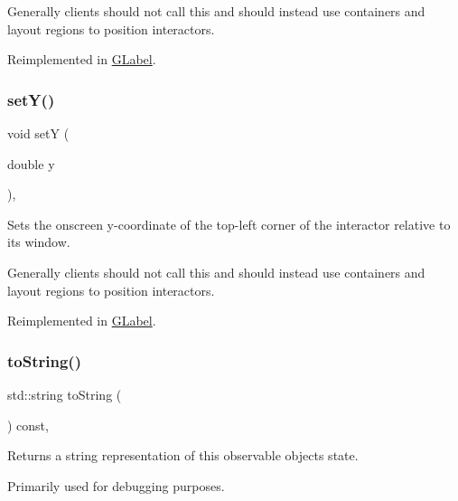 Generally clients should not call this and should instead use containers and layout regions to position interactors. 

Reimplemented in \mbox{\hyperlink{classGLabel_a173837ba805eaa2411e88834869d3a9c}{G\+Label}}.

\mbox{\label{classGInteractor_a7d57e2a5c35d27feb58fd498a3cf82b9}} 
\subsubsection{\texorpdfstring{set\+Y()}{setY()}}
{\footnotesize\ttfamily void setY (\begin{DoxyParamCaption}\item[{double}]{y }\end{DoxyParamCaption})\hspace{0.3cm}{\ttfamily [virtual]}, {\ttfamily [inherited]}}



Sets the onscreen y-\/coordinate of the top-\/left corner of the interactor relative to its window. 

Generally clients should not call this and should instead use containers and layout regions to position interactors. 

Reimplemented in \mbox{\hyperlink{classGLabel_a0b738606c7aca5c472b66c4e55b3c685}{G\+Label}}.

\mbox{\label{classGObservable_a1fe5121d6528fdea3f243321b3fa3a49}} 
\subsubsection{\texorpdfstring{to\+String()}{toString()}}
{\footnotesize\ttfamily std\+::string to\+String (\begin{DoxyParamCaption}{ }\end{DoxyParamCaption}) const\hspace{0.3cm}{\ttfamily [virtual]}, {\ttfamily [inherited]}}



Returns a string representation of this observable object\textquotesingle{}s state. 

Primarily used for debugging purposes. 